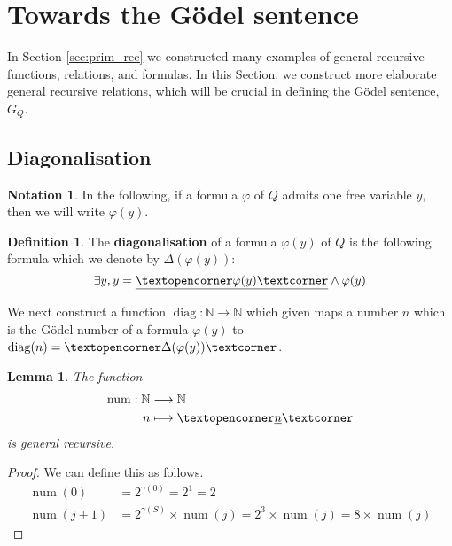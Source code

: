 \documentclass[12pt]{article}
\theoremstyle{plain}
\newtheorem{lemma}[thm]{Lemma}
\theoremstyle{definition}
\newtheorem{defn}[thm]{Definition} %
\newtheorem{notation}[thm]{Notation}
\newcommand{\bb}[1]{\mathbb{#1}}
\newcommand{\adj}[1]{\text{\textopencorner}{#1}\text{\textcorner}}
\newcommand{\lto}{\longrightarrow}
\begin{document}
	\section{Towards the G\"{o}del sentence}\label{sec:crucial}
	In Section \ref{sec:prim_rec} we constructed many examples of general recursive functions, relations, and formulas. In this Section, we construct more elaborate general recursive relations, which will be crucial in defining the G\"{o}del sentence, $G_Q$.
	
	\subsection{Diagonalisation}
	\begin{notation}
		In the following, if a formula $\varphi$ of $Q$ admits one free variable $y$, then we will write $\varphi(y)$.
	\end{notation}
	\begin{defn}
		The \textbf{diagonalisation} of a formula $\varphi(y)$ of $Q$ is the following formula which we denote by $\Delta(\varphi(y))$:
		\begin{equation}
			\exists y, y = \underline{\adj{\varphi(y)}} \wedge \varphi(y)
		\end{equation}
	\end{defn}
	We next construct a function $\operatorname{diag}: \bb{N} \lto \bb{N}$ which given maps a number $n$ which is the G\"{o}del number of a formula $\varphi(y)$ to $\operatorname{diag}(n) = \adj{\Delta(\varphi(y))}$.
	
	\begin{lemma}
		The function
		\begin{align*}
			\operatorname{num}: \bb{N} &\lto \bb{N}\\
			n &\longmapsto \adj{\underline{n}}
		\end{align*}
		is general recursive.
	\end{lemma}
	\begin{proof}
		We can define this as follows.
		\begin{align*}
			\operatorname{num}(0) &= 2^{\gamma(0)} = 2^1 = 2\\
			\operatorname{num}(j+1) &= 2^{\gamma(S)}\times \operatorname{num}(j) = 2^3\times \operatorname{num}(j) = 8 \times \operatorname{num}(j)
		\end{align*}
	\end{proof}
	
\end{document}

